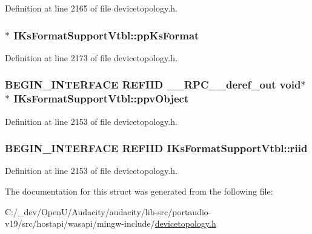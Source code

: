 Definition at line 2165 of file devicetopology.\+h.

\subsubsection[{\texorpdfstring{pp\+Ks\+Format}{ppKsFormat}}]{$\ast$ I\+Ks\+Format\+Support\+Vtbl\+::pp\+Ks\+Format}\hypertarget{struct_i_ks_format_support_vtbl_a1c7baa3ee1432c713cc337514f4482e8}{}\label{struct_i_ks_format_support_vtbl_a1c7baa3ee1432c713cc337514f4482e8}


Definition at line 2173 of file devicetopology.\+h.

\subsubsection[{\texorpdfstring{ppv\+Object}{ppvObject}}]{\setlength{\rightskip}{0pt plus 5cm}B\+E\+G\+I\+N\+\_\+\+I\+N\+T\+E\+R\+F\+A\+CE {\bf R\+E\+F\+I\+ID} {\bf \+\_\+\+\_\+\+R\+P\+C\+\_\+\+\_\+deref\+\_\+out} {\bf void}$\ast$$\ast$ I\+Ks\+Format\+Support\+Vtbl\+::ppv\+Object}\hypertarget{struct_i_ks_format_support_vtbl_a93ed121c067c07dbcbb57c1b4e561229}{}\label{struct_i_ks_format_support_vtbl_a93ed121c067c07dbcbb57c1b4e561229}


Definition at line 2153 of file devicetopology.\+h.

\subsubsection[{\texorpdfstring{riid}{riid}}]{\setlength{\rightskip}{0pt plus 5cm}B\+E\+G\+I\+N\+\_\+\+I\+N\+T\+E\+R\+F\+A\+CE {\bf R\+E\+F\+I\+ID} I\+Ks\+Format\+Support\+Vtbl\+::riid}\hypertarget{struct_i_ks_format_support_vtbl_aba34ed4b195d91294b0de6f60b7af611}{}\label{struct_i_ks_format_support_vtbl_aba34ed4b195d91294b0de6f60b7af611}


Definition at line 2153 of file devicetopology.\+h.



The documentation for this struct was generated from the following file\+:\begin{DoxyCompactItemize}
\item 
C\+:/\+\_\+dev/\+Open\+U/\+Audacity/audacity/lib-\/src/portaudio-\/v19/src/hostapi/wasapi/mingw-\/include/\hyperlink{devicetopology_8h}{devicetopology.\+h}\end{DoxyCompactItemize}
